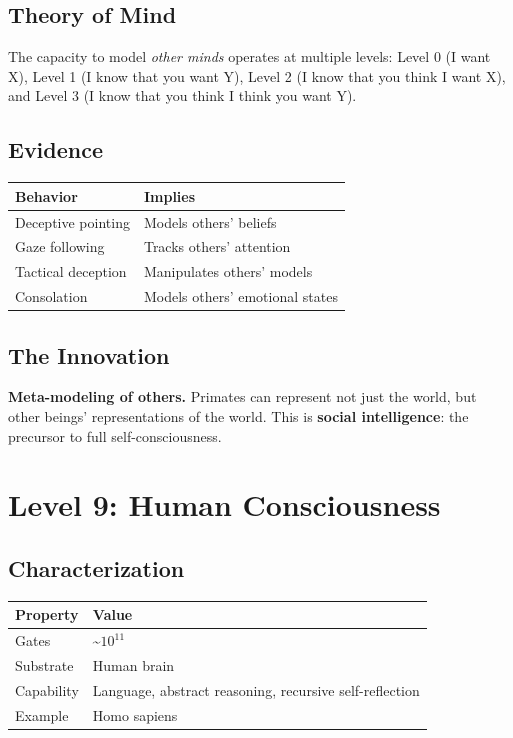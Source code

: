 \documentclass[
  11pt,
  letterpaper,
  twoside,
  openright]{book}
\begin{document}
\subsection{Theory of Mind}\label{theory-of-mind}

The capacity to model \emph{other minds} operates at multiple levels:
Level 0 (I want X), Level 1 (I know that you want Y), Level 2 (I know
that you think I want X), and Level 3 (I know that you think I think you
want Y).

\subsection{Evidence}\label{evidence-1}

\begin{longtable}[]{@{}ll@{}}
\toprule\noalign{}
Behavior & Implies \\
\midrule\noalign{}
\endhead
\bottomrule\noalign{}
\endlastfoot
Deceptive pointing & Models others' beliefs \\
Gaze following & Tracks others' attention \\
Tactical deception & Manipulates others' models \\
Consolation & Models others' emotional states \\
\end{longtable}

\subsection{The Innovation}\label{the-innovation-6}

\textbf{Meta-modeling of others.} Primates can represent not just the
world, but other beings' representations of the world. This is
\textbf{social intelligence}: the precursor to full self-consciousness.

\section{Level 9: Human
Consciousness}\label{level-9-human-consciousness}

\subsection{Characterization}\label{characterization-9}

\begin{longtable}[]{@{}ll@{}}
\toprule\noalign{}
Property & Value \\
\midrule\noalign{}
\endhead
\bottomrule\noalign{}
\endlastfoot
Gates & \textasciitilde{}\(10^{11}\) \\
Substrate & Human brain \\
Capability & Language, abstract reasoning, recursive self-reflection \\
Example & Homo sapiens \\
\end{longtable}
\end{document}
